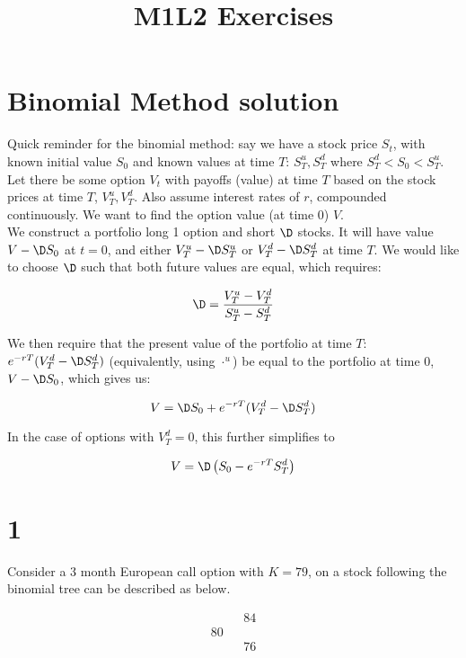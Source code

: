 \documentclass{article}
\begin{document}
	\title{M1L2 Exercises}
	\maketitle
	\section*{Binomial Method solution}
	Quick reminder for the binomial method: say we have a stock price $S_t$, with known initial value $S_0$ and known values at time $T$: $S^u_T, S^d_T$ where $S^d_T < S_0 < S^u_T$. Let there be some option $V_t$ with payoffs (value) at time $T$ based on the stock prices at time $T$, $V^u_T, V^d_T$. Also assume interest rates of $r$, compounded continuously. We want to find the option value (at time 0) $V$.
	\\
	
	We construct a portfolio long 1 option and short $\D$ stocks. It will have value $V - \D S_0$ at $t=0$, and either $V_T^u - \D S_T^u$ or $V_T^d - \D S_T^d$ at time $T$. We would like to choose $\D$ such that both future values are equal, which requires:
	
	\begin{equation}\label{delta}
		\D = \frac{V^u_T - V^d_T}{S^u_T - S^d_T}
	\end{equation}
	
	We then require that the present value of the portfolio at time $T$: $e^{-rT}(V_T^d - \D S_T^d)$ (equivalently, using $\cdot^u$) be equal to the portfolio at time $0$, $V - \D S_0$, which gives us:
	
	\begin{equation}\label{full_solution}
		V = \D S_0 + e^{-rT}(V_T^d - \D S_T^d)
	\end{equation}
	
	In the case of options with $V^d_T = 0$, this further simplifies to
	
	\begin{equation}\label{cool_solution}
		V = \D \left( S_0 - e^{-rT} S_T^d\right)
	\end{equation}
	
	\section*{1}
	Consider a 3 month European call option with $K=79$, on a stock following the  binomial tree can be described as below.
	
	\begin{equation*}
		\begin{array}{ccc}
			   &   & 84 \\
			80 &   & \\
			   &   & 76
		\end{array}
	\end{equation*}
	
\end{document}
